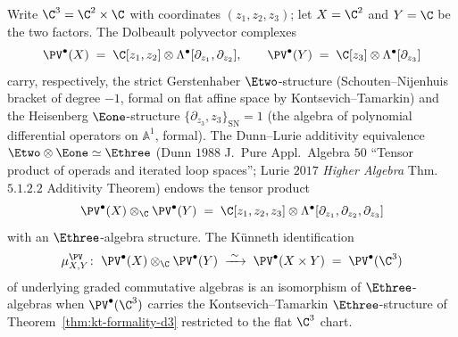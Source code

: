 \begin{theorem}[Toric K\"unneth at \texorpdfstring{$\C^2 \times \C$}{C2 x C}: \texorpdfstring{$\PV^\bullet(\C^3) \simeq \PV^\bullet(\C^2) \otimes \PV^\bullet(\C)$}{PV(C3) = PV(C2) (x) PV(C)} as \texorpdfstring{$\Etwo \otimes \Eone = \Ethree$}{E2 (x) E1 = E3}-algebras]
\label{thm:toric-kunneth-pv-c2-c1}
Write $\C^3 = \C^2 \times \C$ with coordinates $(z_1, z_2, z_3)$; let $X = \C^2$ and $Y = \C$ be the two factors. The Dolbeault polyvector complexes
\[
 \PV^\bullet(X) \;=\; \C[z_1, z_2] \otimes \Lambda^\bullet[\partial_{z_1}, \partial_{z_2}],
 \qquad
 \PV^\bullet(Y) \;=\; \C[z_3] \otimes \Lambda^\bullet[\partial_{z_3}]
\]
carry, respectively, the strict Gerstenhaber $\Etwo$-structure (Schouten--Nijenhuis bracket of degree $-1$, formal on flat affine space by Kontsevich--Tamarkin) and the Heisenberg $\Eone$-structure $\{\partial_{z_3}, z_3\}_{\mathrm{SN}} = 1$ (the algebra of polynomial differential operators on $\mathbb A^1$, formal). The Dunn--Lurie additivity equivalence $\Etwo \otimes \Eone \simeq \Ethree$ (Dunn $1988$ J.\ Pure Appl.\ Algebra $50$ ``Tensor product of operads and iterated loop spaces''; Lurie $2017$ \emph{Higher Algebra} Thm.~$5.1.2.2$ Additivity Theorem) endows the tensor product
\[
 \PV^\bullet(X) \otimes_\C \PV^\bullet(Y) \;=\; \C[z_1, z_2, z_3] \otimes \Lambda^\bullet[\partial_{z_1}, \partial_{z_2}, \partial_{z_3}]
\]
with an $\Ethree$-algebra structure. The K\"unneth identification
\begin{equation}
\label{eq:toric-kunneth-pv}
 \mu^{\PV}_{X,Y}\colon\;\PV^\bullet(X) \otimes_\C \PV^\bullet(Y) \;\xrightarrow{\;\sim\;}\; \PV^\bullet(X \times Y) \;=\; \PV^\bullet(\C^3)
\end{equation}
of underlying graded commutative algebras is an isomorphism of $\Ethree$-algebras when $\PV^\bullet(\C^3)$ carries the Kontsevich--Tamarkin $\Ethree$-structure of Theorem~\ref{thm:kt-formality-d3} restricted to the flat $\C^3$ chart.
\end{theorem}

